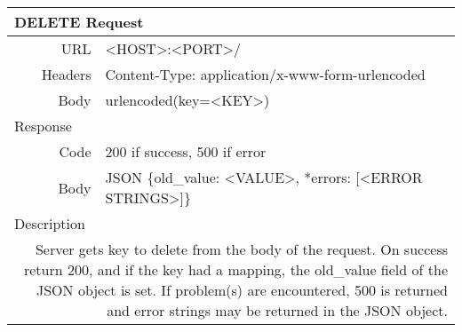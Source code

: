 \begin{table}[h]
  \centering
  \begin{tabular}{|r|l|}
    \hline
    \multicolumn{2}{|l|}{DELETE Request} \\ \hline
    URL & <HOST>:<PORT>/ \\
    Headers & Content-Type: application/x-www-form-urlencoded \\
    Body & urlencoded(key=<KEY>) \\ \hline
    \multicolumn{2}{|l|}{Response} \\ \hline
    Code & 200 if success, 500 if error \\
    Body & JSON \{old\_value: <VALUE>, *errors: [<ERROR STRINGS>]\} \\ \hline
    \multicolumn{2}{|l|}{Description} \\ \hline
    \multicolumn{2}{|p{0.75\textwidth}|}{Server gets key to delete from the body
                         of the request. On success return 200, and if the key
                         had a mapping, the old\_value field of the JSON object
                         is set. If problem(s) are encountered, 500 is returned
                         and error strings may be returned in the JSON object.}
                         \\ \hline
  \end{tabular}
\end{table}
